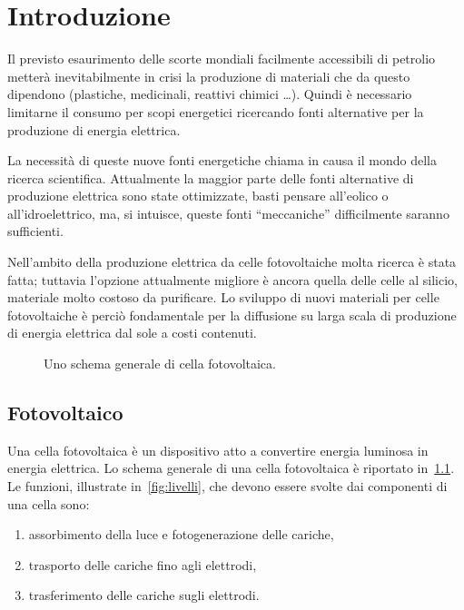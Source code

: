 \chapter[Introduzione]{Introduzione}

Il previsto esaurimento delle scorte mondiali facilmente accessibili di petrolio metterà inevitabilmente in crisi la produzione di materiali che da questo dipendono (plastiche, medicinali, reattivi chimici \ldots ). Quindi è necessario limitarne il consumo per scopi energetici ricercando fonti alternative per la produzione di energia elettrica.
        
La necessità di queste nuove fonti energetiche chiama in causa il mondo della ricerca scientifica. Attualmente la maggior parte delle fonti alternative di produzione elettrica sono state ottimizzate, basti pensare all'eolico o all'idroelettrico, ma, si intuisce, queste fonti ``meccaniche'' difficilmente saranno sufficienti. 
        
Nell'ambito della produzione elettrica da celle fotovoltaiche molta ricerca è stata fatta; tuttavia l'opzione attualmente migliore è ancora quella delle celle al silicio, materiale molto costoso da purificare. Lo sviluppo di nuovi materiali per celle fotovoltaiche è perciò fondamentale per la diffusione su larga scala di produzione di energia elettrica dal sole a costi contenuti.

\begin{figure}
\caption{\footnotesize{Uno schema generale di cella fotovoltaica.}
\label{fig:pv-schema1}}
\end{figure}

\section{Fotovoltaico}
Una cella fotovoltaica è un dispositivo atto a convertire energia luminosa in energia elettrica. Lo schema generale di una cella fotovoltaica è riportato in~\ref{fig:pv-schema1}.
Le funzioni, illustrate in~\ref{fig:livelli}, che devono essere svolte dai componenti di una cella sono:
\begin{enumerate}[label=\roman{*}.]
\item assorbimento della luce e fotogenerazione delle cariche,
\item trasporto delle cariche fino agli elettrodi,
\item trasferimento delle cariche sugli elettrodi.
\end{enumerate}


